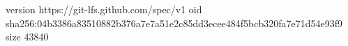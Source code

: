 version https://git-lfs.github.com/spec/v1
oid sha256:04b3386a83510882b376a7e7a51e2c85dd3ecee484f5bcb320fa7e71d54e93f9
size 43840
